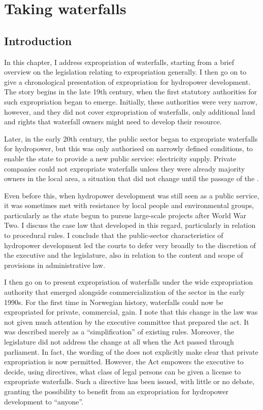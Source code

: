 \chapter{Taking waterfalls}\label{chap:4}

\section{Introduction}\label{sec:intro4}

In this chapter, I address expropriation of waterfalls, starting from a brief overview on the legislation relating to expropriation generally. I then go on to give a chronological presentation of expropriation for hydropower development. The story begins in the late 19th century, when the first statutory authorities for such expropriation began to emerge. Initially, these authorities were very narrow, however, and they did not cover expropriation of waterfalls, only additional land and rights that waterfall owners might need to develop their resource. 

Later, in the early 20th century, the public sector began to expropriate waterfalls for hydropower, but this was only authorised on narrowly defined conditions, to enable the state to provide a new public service: electricity supply. Private companies could not expropriate waterfalls unless they were already majority owners in the local area, a situation that did not change until the passage of the \cite{wra00}. 

Even before this, when hydropower development was still seen as a public service, it was sometimes met with resistance by local people and environmental groups, particularly as the state begun to pursue large-scale projects after World War Two. I discuss the case law that developed in this regard, particularly in relation to procedural rules. I conclude that the public-sector characteristics of hydropower development led the courts to defer very broadly to the discretion of the executive and the legislature, also in relation to the content and scope of provisions in administrative law. 

I then go on to present expropriation of waterfalls under the wide expropriation authority that emerged alongside commercialization of the sector in the early 1990s. For the first time in Norwegian history, waterfalls could now be expropriated for private, commercial, gain. I note that this change in the law was not given much attention by the executive committee that prepared the act. It was described merely as a ``simplification'' of existing rules. Moreover, the legislature did not address the change at all when the Act passed through parliament. In fact, the wording of the \cite{wra00} does not explicitly make clear that private expropriation is now permitted. However, the Act empowers the executive to decide, using directives, what class of legal persons can be given a license to expropriate waterfalls. Such a directive has been issued, with little or no debate, granting the possibility to benefit from an expropriation for hydropower development to ``anyone''.

